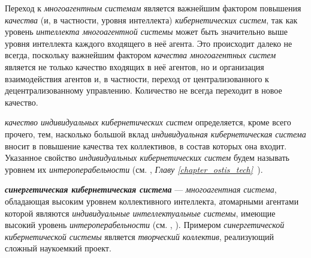 {\label{sec_mas_overall_quality}} 

Переход к \textit{многоагентным системам} является важнейшим фактором повышения \textit{качества} (и, в частности, уровня интеллекта) \textit{кибернетических систем}, так как уровень \textit{интеллекта многоагентной системы} может быть значительно выше уровня интеллекта каждого входящего в неё агента. 
Это происходит далеко не всегда, поскольку важнейшим фактором \textit{качества многоагентных систем} является не только качество входящих в неё агентов, но и организация взаимодействия агентов и, в частности, переход от централизованного к децентрализованному управлению. 
Количество не всегда переходит в новое качество.

\textit{качество индивидуальных кибернетических систем} определяется, кроме всего прочего, тем, насколько большой вклад \textit{индивидуальная кибернетическая система} вносит в повышение качества тех коллективов, в состав которых она входит.
Указанное свойство \textit{индивидуальных кибернетических систем} будем называть уровнем их \textit{интероперабельности} (см. , \textit{Главу \ref{chapter_ostis_tech}~}).

\textbf{\textit{синергетическая кибернетическая система}} --- \textit{многоагентная система}, обладающая высоким уровнем коллективного интеллекта, атомарными агентами которой являются \textit{индивидуальные интеллектуальные системы}, имеющие высокий уровень \textit{интероперабельности} (см. , ).
Примером \textit{синергетической кибернетической системы} является \textit{творческий коллектив}, реализующий сложный наукоемкий проект.

